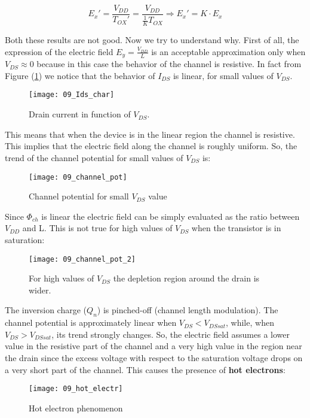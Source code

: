 \documentclass[a4paper, 12pt, twoside, openright]{report}
\begin{document}
\begin{enumerate}
	\begin{equation}
	E_x' = \frac{V_{DD}}{T_{OX}'} = \frac{V_{DD}}{\frac{1}{K}T_{OX}} \Rightarrow E_x' = K \cdot E_x
	\label{}
	\end{equation}

Both these results are not good. Now we try to understand why.
First of all, the expression of the electric field $E_y = \frac{V_{DD}}{L}$ is an acceptable approximation only when $V_{DS} \approx 0$ because in this case the behavior of the channel is resistive. In fact from Figure (\ref{ids}) we notice that the behavior of $I_{DS}$ is linear, for small values of $V_{DS}$.

	\begin{figure}[H]
	\centering
	\texttt{[image: 09\_Ids\_char]}
	\caption{Drain current in function of $V_{DS}$.}
	\label{ids}
	\end{figure}

This means that when the device is in the linear region the channel is resistive. This implies that the electric field along the channel is roughly uniform. So, the trend of the channel potential for small values of $V_{DS}$ is:

	\begin{figure}[H]
	\centering
	\texttt{[image: 09\_channel\_pot]}
	\caption{Channel potential for small $V_{DS}$ value}
	\label{}
	\end{figure}

Since $\Phi_{ch}$ is linear the electric field can be simply evaluated as the ratio between $V_{DD}$ and L. This is not true for high values of $V_{DS}$ when the transistor is in saturation:

	\begin{figure}[H]
	\centering
	\texttt{[image: 09\_channel\_pot\_2]}
	\caption{For high values of $V_{DS}$ the depletion region around the drain is wider.}
	\label{}
	\end{figure}

The inversion charge ($Q_{n}$) is pinched-off (channel length modulation). The channel potential is approximately linear when $V_{DS} < V_{DSsat}$, while, when $V_{DS} > V_{DSsat}$, its trend strongly changes. So, the electric field assumes a lower value in the resistive part of the channel and a very high value in the region near the drain since the excess voltage with respect to the saturation voltage drops on a very short part of the channel. This causes the presence of \textbf{hot electrons}:

	\begin{figure}[H]
	\centering
	\texttt{[image: 09\_hot\_electr]}
	\caption{Hot electron phenomenon}
	\label{}
	\end{figure}


\end{enumerate}
\end{document}
